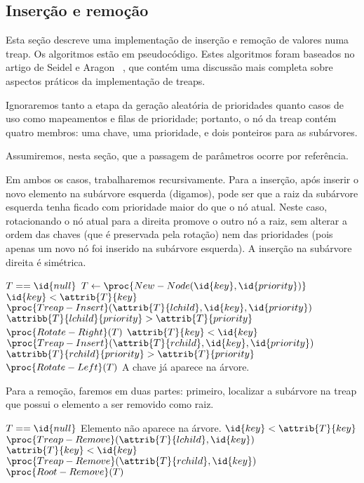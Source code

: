 \subsection{Inserção e remoção}
Esta seção descreve uma implementação de inserção e remoção de valores numa treap.
Os algoritmos estão em pseudocódigo.
Estes algoritmos foram baseados no artigo de Seidel e Aragon~%
\cite[p.~450]{SeidelAragon1996},
que contém uma discussão mais completa sobre aspectos práticos da implementação de treaps.

Ignoraremos tanto a etapa da geração aleatória de prioridades
quanto casos de uso como mapeamentos e filas de prioridade;
portanto,
o nó da treap contém quatro membros:
uma chave, uma prioridade,
e dois ponteiros para as subárvores.

Assumiremos, nesta seção,
que a passagem de parâmetros ocorre por referência.

Em ambos os casos,
trabalharemos recursivamente.
Para a inserção,
após inserir o novo elemento na subárvore esquerda (digamos),
pode ser que a raiz da subárvore esquerda
tenha ficado com prioridade maior do que o nó atual.
Neste caso,
rotacionando o nó atual para a direita promove o outro nó a raiz,
sem alterar a ordem das chaves
(que é preservada pela rotação)
nem das prioridades
(pois apenas um novo nó foi inserido na subárvore esquerda).
A inserção na subárvore direita é simétrica.

\begin{codebox}
    \li \If $T == \id{null}$
    \li \Then
            $T \gets \proc{New-Node(\id{key}, \id{priority})}$
    \li \ElseIf $\id{key} < \attrib{T}{key}$
    \li \Then
            $\proc{Treap-Insert}(\attrib{T}{lchild}, \id{key}, \id{priority})$
    \li     \If $\attribb{T}{lchild}{priority} > \attrib{T}{priority}$
    \li         \Then $\proc{Rotate-Right}(T)$
            \End
    \li \ElseIf $\attrib{T}{key} < \id{key}$
    \li \Then
            $\proc{Treap-Insert}(\attrib{T}{rchild}, \id{key}, \id{priority})$
    \li     \If $\attribb{T}{rchild}{priority} > \attrib{T}{priority}$
    \li         \Then $\proc{Rotate-Left}(T)$
            \End
    \li \ElseNoIf
    \li     \Comment A chave já aparece na árvore.
        \End
\end{codebox}

Para a remoção,
faremos em duas partes:
primeiro, localizar a subárvore na treap
que possui o elemento a ser removido como raiz.

\begin{codebox}
    \li \If $T == \id{null}$
    \li \Then \Comment Elemento não aparece na árvore.
    \li \ElseIf $\id{key} < \attrib{T}{key}$
    \li \Then $\proc{Treap-Remove}(\attrib{T}{lchild}, \id{key})$
    \li \ElseIf $\attrib{T}{key} < \id{key}$
    \li \Then $\proc{Treap-Remove}(\attrib{T}{rchild}, \id{key})$
    \li \ElseNoIf
    \li     $\proc{Root-Remove}(T)$
        \End
\end{codebox}

